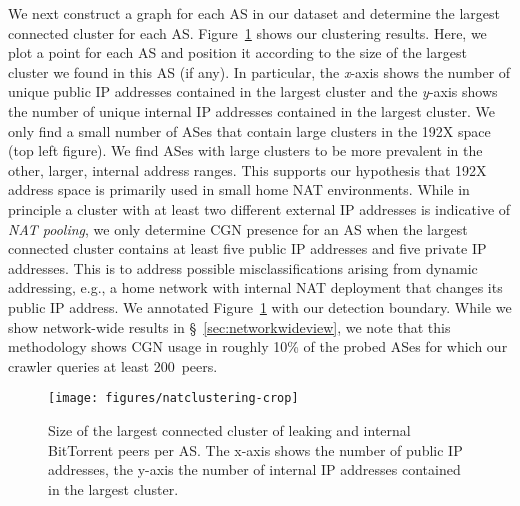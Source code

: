 \documentclass[10pt]{sig-alternate-05-2015}
\newcommand\xref[1]{\S~\ref{#1}}
\begin{document}
We next construct a graph for each AS in our dataset and determine the largest 
connected cluster for each AS. Figure~\ref{fig:btnatclustering} shows our 
clustering results. Here, we plot a point for each AS and position it according 
to the size of the largest cluster we found in this AS (if any). In particular, 
the \textit{x}-axis shows the number of unique public IP addresses contained in 
the 
largest cluster and the \textit{y}-axis shows the number of unique internal IP 
addresses contained in the largest cluster. 
We only find a small number of ASes that contain large clusters in
the 192X space  
(top left figure).  We find ASes with large clusters to be more
prevalent in the 
other, larger, internal address ranges. This supports our hypothesis
that 192X address space  
is primarily used in small home NAT environments.
While in principle a cluster with 
at least two different external IP addresses is indicative of \textit{NAT 
pooling}, we only determine CGN presence for an AS when the largest connected 
cluster contains at least five public IP addresses and five private IP 
addresses. This is to address possible misclassifications arising from dynamic 
addressing, e.g., a home network with internal NAT deployment that changes its 
public IP address. We annotated Figure~\ref{fig:btnatclustering} with our 
detection boundary.
While we show network-wide results in \xref{sec:networkwideview}, we note that 
this methodology shows CGN usage in roughly 10\% of the probed ASes
for which our crawler queries at least 200~peers. 

 \begin{figure}
   \begin{center}
\texttt{[image: figures/natclustering-crop]}
   \caption{Size of the largest connected cluster of leaking and internal 
   BitTorrent peers per AS. The x-axis shows the number of public IP addresses, 
   the y-axis the number of internal IP addresses contained in the largest 
   cluster.}
     \label{fig:btnatclustering}
   \end{center}
     \vspace{-1.5em}
\end{figure}
\end{document}
